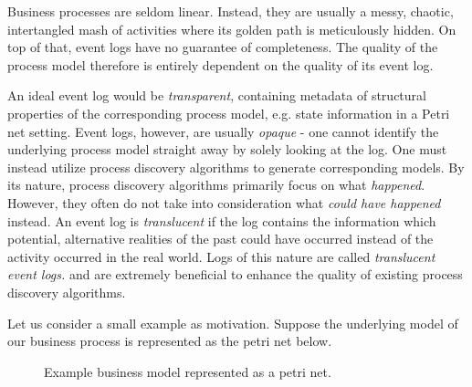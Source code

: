 Business processes are seldom linear. Instead, they are usually a messy, chaotic, intertangled mash of activities where its golden path is meticulously hidden. On top of that, event logs have no guarantee of completeness. The quality of the process model therefore is entirely dependent on the quality of its event log.

An ideal event log would be \emph{transparent}, containing metadata of structural properties of the corresponding process model, e.g. state information in a Petri net setting. Event logs, however, are usually \emph{opaque} - one cannot identify the underlying process model straight away by solely looking at the log. One must instead utilize process discovery algorithms to generate corresponding models. By its nature, process discovery algorithms primarily focus on what \emph{happened}. However, they often do not take into consideration what \emph{could have happened} instead. An event log is \textit{translucent} if the log contains the information which potential, alternative realities of the past could have occurred instead of the activity occurred in the real world. Logs of this nature are called \textit{translucent event logs.} and are extremely beneficial to enhance the quality of existing process discovery algorithms.

Let us consider a small example as motivation. Suppose the underlying model of our business process is represented as the petri net below.

\begin{figure}[h]
    \centering
\caption{Example business model represented as a petri net.}
\label{petrinet}

\end{figure}

